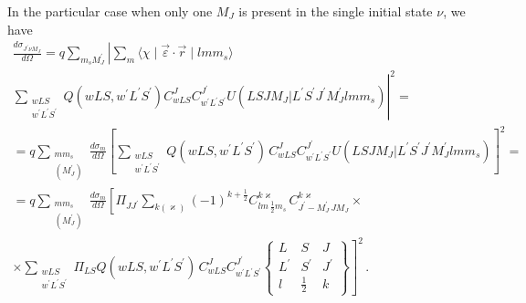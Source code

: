 \documentclass[a4paper,oneside,12pt]{extarticle}
\begin{document}
%
%
In the particular case when only one $M_J$ is present in the single initial state $\nu$, we have
%
\begin{multline}
\frac{d \sigma_{J^{\prime}\nu M_J}}{d \Omega} = q \sum_{m_s M_J^{\prime}} 
\left| \sum_m \langle \chi \mid \vec{\varepsilon} \cdot \vec{r}  \mid lmm_s \rangle \right. \\
\left. 
\sum_{\substack{wLS \\w^{\prime}L^{\prime} S^{\prime} }} Q(wLS,w^{\prime}L^{\prime} S^{\prime})
C^J_{wLS} C^{J^{\prime}}_{w^{\prime}L^{\prime} S^{\prime}}
U(L S J M_J | L^{\prime} S^{\prime} J^{\prime} M_J^{\prime} l m m_s) \right|^2 =\\=
q \sum_{\substack{mm_s\\ (M_J^{\prime})}} \frac{d \sigma_m}{d \Omega}
\left[ \sum_{\substack{wLS\\w^{\prime}L^{\prime} S^{\prime}}} Q(wLS,w^{\prime}L^{\prime} S^{\prime}) \, 
C^J_{wLS} C^{J^{\prime}}_{w^{\prime}L^{\prime} S^{\prime}}
U(L S J M_J | L^{\prime} S^{\prime} J^{\prime} M_J^{\prime} l m m_s) \right]^2 =\\=
q \sum_{\substack{mm_s\\ (M_J^{\prime})}} \frac{d \sigma_m}{d \Omega}
\left[ \Pi_{JJ^{\prime}} \sum_{k (\varkappa)}
(-1)^{k+\frac{1}{2}}
C^{k\varkappa}_{lm \, \frac{1}{2}m_s} \,
C^{k\varkappa}_{J^{\prime} -M_J^{\prime} \, J M_J} \right.\times \\ \times\left.
\sum_{\substack{wLS\\w^{\prime}L^{\prime} S^{\prime}}} \Pi_{LS}
Q(wLS,w^{\prime}L^{\prime} S^{\prime}) \, 
C^J_{wLS} C^{J^{\prime}}_{w^{\prime}L^{\prime} S^{\prime}}
\left \{
\begin{array}{ccc}
L & S & J \\
L^{\prime} & S^{\prime} & J^{\prime} \\
l & \frac{1}{2} & k
\end{array}
\right \} \right]^2 \,.
\end{multline}
%
\end{document}
